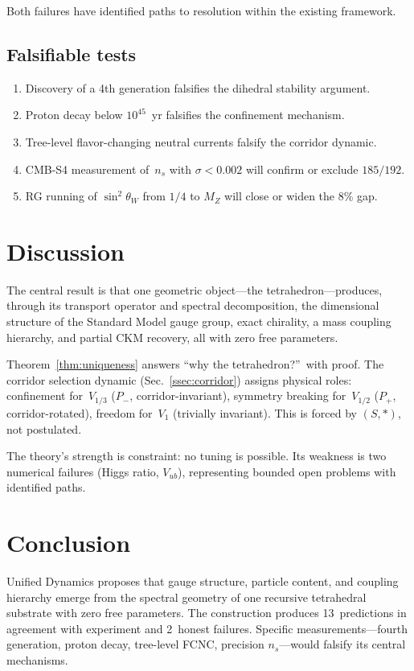 \documentclass[%
 aip,
 amsmath,amssymb,
 reprint,%
]{revtex4-1}
\newcommand{\Vone}{V_1}
\newcommand{\Vhalf}{V_{1/2}}
\newcommand{\Vthird}{V_{1/3}}
\newcommand{\Pp}{P_+}
\newcommand{\Pm}{P_-}
\begin{document}
Both failures have identified paths to resolution within the existing framework.

\subsection{Falsifiable tests}

\begin{enumerate}
\item Discovery of a 4th generation falsifies the dihedral stability argument.
\item Proton decay below $10^{45}$~yr falsifies the confinement mechanism.
\item Tree-level flavor-changing neutral currents falsify the corridor dynamic.
\item CMB-S4 measurement of~$n_s$ with $\sigma<0.002$ will confirm or exclude $185/192$.
\item RG running of $\sin^2\theta_W$ from $1/4$ to $M_Z$ will close or widen the $8\%$ gap.
\end{enumerate}


\section{\label{sec:discussion}Discussion}

The central result is that one geometric object---the tetrahedron---produces, through its transport operator and spectral decomposition, the dimensional structure of the Standard Model gauge group, exact chirality, a mass coupling hierarchy, and partial CKM recovery, all with zero free parameters.

Theorem~\ref{thm:uniqueness} answers ``why the tetrahedron?''\ with proof. The corridor selection dynamic (Sec.~\ref{ssec:corridor}) assigns physical roles: confinement for~$\Vthird$ ($\Pm$, corridor-invariant), symmetry breaking for~$\Vhalf$ ($\Pp$, corridor-rotated), freedom for~$\Vone$ (trivially invariant). This is forced by $(S,*)$, not postulated.

The theory's strength is constraint: no tuning is possible. Its weakness is two numerical failures (Higgs ratio, $V_{ub}$), representing bounded open problems with identified paths.


\section{\label{sec:conclusion}Conclusion}

Unified Dynamics proposes that gauge structure, particle content, and coupling hierarchy emerge from the spectral geometry of one recursive tetrahedral substrate with zero free parameters. The construction produces 13~predictions in agreement with experiment and 2~honest failures. Specific measurements---fourth generation, proton decay, tree-level FCNC, precision $n_s$---would falsify its central mechanisms.
\end{document}
